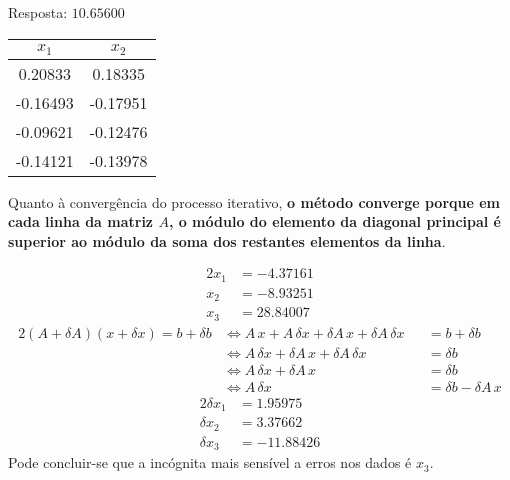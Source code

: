\setcounter{chapter}{11}
{
\renewcommand{\thesubsection}{\thesection\alph{subsection}}

Resposta: $10.65600$

\begin{center} \begin{tabular}{c | c}
	$x_1$ & $x_2$ \\ \hline
	0.20833  &       0.18335 \\
	-0.16493 &       -0.17951 \\
	-0.09621 &       -0.12476 \\
	-0.14121 &       -0.13978
\end{tabular} \end{center}
Quanto à convergência do processo iterativo, \textbf{o método converge porque em cada linha da matriz $A$, o módulo do elemento da diagonal principal é superior ao módulo da soma dos restantes elementos da linha}.


\begin{alignat*}{2}
	x_1 &= -4.37161 \\
	x_2 &= -8.93251 \\
	x_3 &= 28.84007
\end{alignat*}
\begin{alignat*}{2}
	(A+\delta A)(x+\delta x)=b+\delta b
	&\iff A\,x+A\,\delta x+\delta A\, x + \delta A\, \delta x &&= b+\delta b\\
	&\iff A\,\delta x+\delta A\, x + \delta A\, \delta x &&= \delta b\\
	&\iff A\,\delta x+\delta A\, x &&= \delta b\\
	&\iff A\,\delta x &&= \delta b - \delta A\, x
\end{alignat*}
\begin{alignat*}{2}
	\delta x_1 &= 1.95975\\
	\delta x_2 &= 3.37662\\
	\delta x_3 &= -11.88426
\end{alignat*}
Pode concluir-se que a incógnita mais sensível a erros nos dados é $x_3$.
\begin{center} \begin{tabular}{l | c || l | c}

\end{tabular}
\end{center}}
